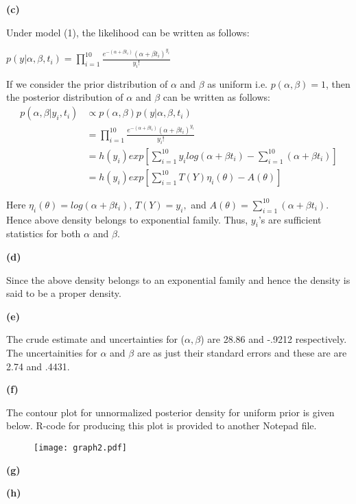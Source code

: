 \documentclass[12pt]{article}
\begin{document}
\newpage
\textbf{(c)}

Under model (1), the likelihood can be written as follows:

$p(y|\alpha,\beta,t_{i}) = \prod_{i=1}^{10}\frac{e^{-(\alpha+\beta t_{i})}(\alpha+\beta t_{i})^{y_{i}}}{y_{i}!}$

If we consider the prior distribution of $\alpha$ and $\beta$ as uniform i.e. $p(\alpha, \beta)= 1$, then the posterior distribution of $\alpha$ and $\beta$ can be written as follows:
\begin{equation*}
\begin{split}
p(\alpha,\beta|y_{i},t_{i})&\propto p(\alpha, \beta)p(y|\alpha,\beta,t_{i})\\
&=\prod_{i=1}^{10}\frac{e^{-(\alpha+\beta t_{i})}(\alpha+\beta t{_i})^{y_{i}}}{y_{i}!}\\
&=h(y_{i})exp[\sum_{i=1}^{10}y_{i}log(\alpha+\beta t_{i})-\sum_{i=1}^{10}(\alpha+\beta t_{i})]\\
&=h(y_{i})exp[\sum_{i=1}^{10}T(Y)\eta_{i}(\theta)-A(\theta)]
\end{split}
\end{equation*}

Here $\eta_{i}(\theta)=log(\alpha +\beta t_{i})$, $T(Y)=y_{i},$ and $A(\theta)=\sum_{i=1}^{10}(\alpha+\beta t_{i}).$ Hence above density belongs to exponential family. Thus, $y_{i}$'s are sufficient statistics for both $\alpha$ and $\beta$.

\textbf{(d)}

Since the above density belongs to an exponential family and hence the density is said to be a proper density.

\textbf{(e)}

The crude estimate and uncertainties for ($\alpha,\beta$) are 28.86 and -.9212 respectively. The uncertainities for $\alpha$ and $\beta$ are as just their standard errors and these are are 2.74 and .4431.

\textbf{(f)}

The contour plot for unnormalized posterior density for uniform prior is given below. R-code for producing this plot is provided to another Notepad file.

\newpage
\begin{figure}[h]
\centering
\texttt{[image: graph2.pdf]}
\end{figure}

\textbf{(g)}



\textbf{(h)}
\end{document}
